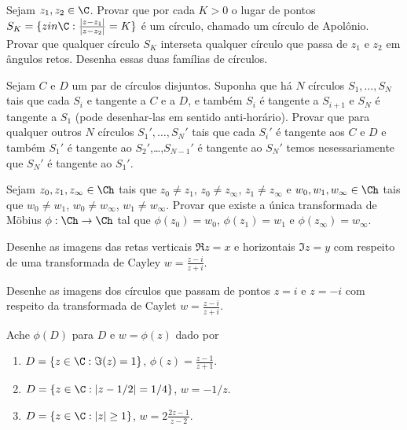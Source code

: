 \begin{problema}
Sejam $z_1,z_2\in\C$. Provar que por cada $K>0$ o lugar de pontos
$S_K = \{z in \C: \frac{|z-z_1|}{|z-z_2|} = K \}$ é um círculo, chamado um círculo de Apolônio.
Provar que qualquer círculo $S_K$ interseta qualquer círculo que passa de $z_1$ e $z_2$ em ângulos retos.
Desenha essas duas famílias de círculos.
\end{problema}

\begin{problema}
Sejam $C$ e $D$ um par de círculos disjuntos. Suponha que há $N$ círculos
$S_1,\dots,S_N$ tais que cada $S_i$ e tangente a $C$ e a $D$,
e também $S_i$ é tangente a $S_{i+1}$ e $S_N$ é tangente a $S_1$ (pode desenhar-las em sentido anti-horário).
Provar que para qualquer outros $N$ círculos $S_1',\dots,S_N'$ tais que
cada $S_i'$ é tangente aos $C$ e $D$ e também $S_1'$ é tangente ao $S_2'$,\dots,$S_{N-1}'$ é tangente ao $S_N'$
temos nesessariamente que $S_N'$ é tangente ao $S_1'$.
\end{problema}

\begin{problema}
Sejam 
$z_0,z_1,z_\infty \in\Ch$ tais que $z_0\neq z_1$, $z_0\neq z_\infty$, $z_1\neq z_\infty$
e 
$w_0,w_1,w_\infty \in\Ch$ tais que $w_0\neq w_1$, $w_0\neq w_\infty$, $w_1\neq w_\infty$.
Provar que existe a única transformada de Möbius $\phi : \Ch \to \Ch$ tal que
$\phi(z_0) = w_0$, $\phi(z_1) = w_1$ e $\phi(z_\infty) = w_\infty$.
\end{problema}

\begin{problema}
Desenhe as imagens das retas verticais $\Re z = x$ e horizontais $\Im z = y$
com respeito de uma transformada de Cayley $w = \frac{z-i}{z+i}$.
\end{problema}

\begin{problema}
Desenhe as imagens dos círculos que passam de pontos $z=i$ e $z=-i$ com respeito da transformada
de Caylet $w = \frac{z-i}{z+i}$.
\end{problema}

\begin{problema}
Ache $\phi(D)$ para $D$ e $w=\phi(z)$ dado por
\begin{enumerate}
\item $D = \{z\in\C: \Im(z) = 1\}$, $\phi(z) = \frac{z-1}{z+1}$.
\item $D = \{z\in\C: |z-1/2| = 1/4\}$, $w = -1/z$.
\item $D = \{z\in\C: |z|\geq 1 \}$, $w = 2 \frac{2z-1}{z-2}$.
\end{enumerate}
\end{problema}
